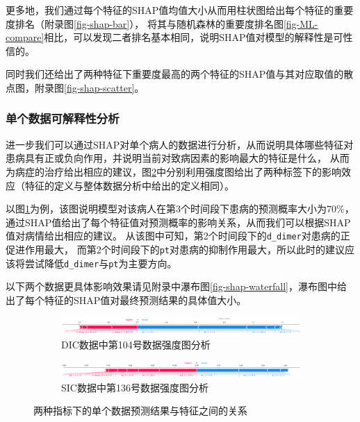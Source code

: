 \documentclass[12pt, a4paper, oneside]{ctexart}
\numberwithin{equation}{section}  %
\begin{document}
更多地，我们通过每个特征的SHAP值均值大小从而用柱状图给出每个特征的重要度排名（附录图\ref{fig-shap-bar}），
将其与随机森林的重要度排名图\ref{fig-ML-compare}相比，可以发现二者排名基本相同，说明SHAP值对模型的解释性是可性信的。

同时我们还给出了两种特征下重要度最高的两个特征的SHAP值与其对应取值的散点图，附录图\ref{fig-shap-scatter}。
\subsubsection{单个数据可解释性分析}
进一步我们可以通过SHAP对单个病人的数据进行分析，从而说明具体哪些特征对患病具有正或负向作用，并说明当前对致病因素的影响最大的特征是什么，
从而为病症的治疗给出相应的建议，图\ref{fig-shap-force}中分别利用强度图\cite{bib-shap-force}给出了两种标签下的影响效应（特征的定义与整体数据分析中给出的定义相同）。

以图\ref{fig-shap-dic-force}为例，该图说明模型对该病人在第3个时间段下患病的预测概率大小为$70\%$，
通过SHAP值给出了每个特征值对预测概率的影响关系，从而我们可以根据SHAP值对病情给出相应的建议。
从该图中可知，第2个时间段下的\texttt{d\_dimer}对患病的正促进作用最大，
而第2个时间段下的\texttt{pt}对患病的抑制作用最大，所以此时的建议应该将尝试降低\texttt{d\_dimer}与\texttt{pt}为主要方向。

以下两个数据更具体影响效果请见附录中瀑布图\ref{fig-shap-waterfall}，瀑布图中给出了每个特征的SHAP值对最终预测结果的具体值大小。
\begin{figure}[H]
   \begin{subfigure}[b]{1\textwidth}
       \hspace{-2.6cm}
       \includegraphics[scale=0.133]{SHAP/单个数据_shap_dic_force}
       \caption{DIC数据中第104号数据强度图分析}
       \label{fig-shap-dic-force}
   \end{subfigure}

   \bigskip
   \begin{subfigure}[b]{1\textwidth}
       \hspace{-2.6cm}
       \includegraphics[scale=0.133]{SHAP/单个数据_shap_sic_force}
       \caption{SIC数据中第136号数据强度图分析}
   \end{subfigure}
   \caption{两种指标下的单个数据预测结果与特征之间的关系}
   \label{fig-shap-force}
\end{figure}
\clearpage
\end{document}
